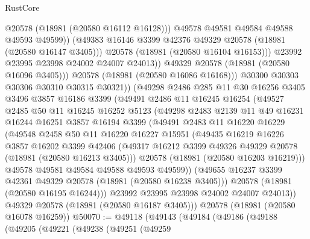 \begin{lexlean}{RustCore}
\begin{coremodule}
                        @20578
                        (@18981 (@20580 @16112 @16128)))
                      @49578
                      @49581
                      @49584
                      @49588
                      @49593
                      @49599))
                  (@49383 @16146 @3399 @42376 @49329 @20578 (@18981 (@20580 @16147 @3405)))
                  @20578
                  (@18981 (@20580 @16104 @16153)))
                @23992
                @23995
                @23998
                @24002
                @24007
                @24013))
            @49329
            @20578
            (@18981 (@20580 @16096 @3405)))
          @20578
          (@18981 (@20580 @16086 @16168)))
        @30300
        @30303
        @30306
        @30310
        @30315
        @30321))
    (@49298
      @2486
      @285
      @11
      @30
      @16256
      @3405
      @3496
      @3857
      @16186
      @3399
      (@49491
        @2486
        @11
        @16245
        @16254
        (@49527
          @2485
          @50
          @11
          @16245
          @16252
          @5123
          (@49298
            @2483
            @2139
            @11
            @49
            @16231
            @16244
            @16251
            @3857
            @16194
            @3399
            (@49491
              @2483
              @11
              @16220
              @16229
              (@49548
                @2458
                @50
                @11
                @16220
                @16227
                @15951
                (@49435
                  @16219
                  @16226
                  @3857
                  @16202
                  @3399
                  @42406
                  (@49317 @16212 @3399 @49326 @49329 @20578 (@18981 (@20580 @16213 @3405)))
                  @20578
                  (@18981 (@20580 @16203 @16219)))
                @49578
                @49581
                @49584
                @49588
                @49593
                @49599))
            (@49655 @16237 @3399 @42361 @49329 @20578 (@18981 (@20580 @16238 @3405)))
            @20578
            (@18981 (@20580 @16195 @16244)))
          @23992
          @23995
          @23998
          @24002
          @24007
          @24013))
      @49329
      @20578
      (@18981 (@20580 @16187 @3405)))
    @20578
    (@18981 (@20580 @16078 @16259))
@50070 := @49118
    (@49143
      (@49184
        (@49186
          (@49188
            (@49205
              (@49221
                (@49238
                  (@49251
                    (@49259

\end{coremodule}
\end{lexlean}
